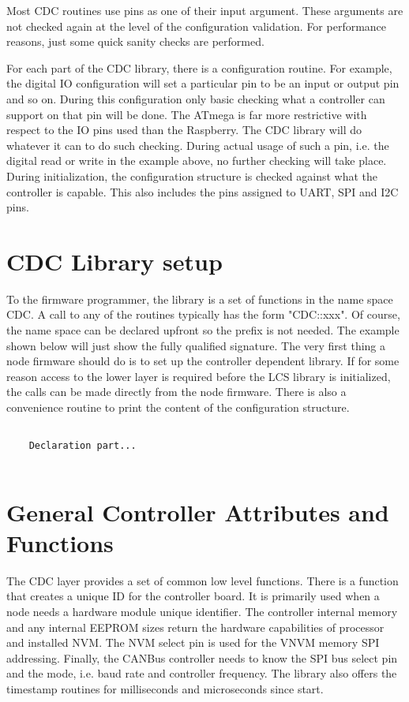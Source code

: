 Most CDC routines use pins as one of their input argument. These arguments are not checked again at the level of the configuration validation. For performance reasons, just some quick sanity checks are performed.

For each part of the CDC library, there is a configuration routine. For example, the digital IO configuration will set a particular pin to be an input or output pin and so on. During this configuration only basic checking what a controller can support on that pin will be done. The ATmega is far more restrictive with respect to the IO pins used than the Raspberry. The CDC library will do whatever it can to do such checking. During actual usage of such a pin, i.e. the digital read or write in the example above, no further checking will take place. During initialization, the configuration structure is checked against what the controller is capable. This also includes the pins assigned to UART, SPI and I2C pins.

\section{CDC Library setup}

To the firmware programmer, the library is a set of functions in the name space CDC. A call to any of the routines typically has the form "CDC::xxx". Of course, the name space can be declared upfront so the prefix is not needed. The example shown below will just show the fully qualified signature. The very first thing a node firmware should do is to set up the controller dependent library. If for some reason access to the lower layer is required before the LCS library is initialized, the calls can be made directly from the node firmware. There is also a convenience routine to print the content of the configuration structure.

\lstset{language=c++, style=codesnippetstyle}
\begin{lstlisting}
   
    Declaration part...
    
\end{lstlisting}

\section{General Controller Attributes and Functions}

The CDC layer provides a set of common low level functions. There is a function that creates a unique ID for the controller board. It is primarily used when a node needs a hardware module unique identifier. The controller internal memory and any internal EEPROM sizes return the hardware capabilities of processor and installed NVM. The NVM select pin is used for the VNVM memory SPI addressing. Finally, the CANBus controller needs to know the SPI bus select pin and the mode, i.e. baud rate and controller frequency. The library also offers the timestamp routines for milliseconds and microseconds since start.

